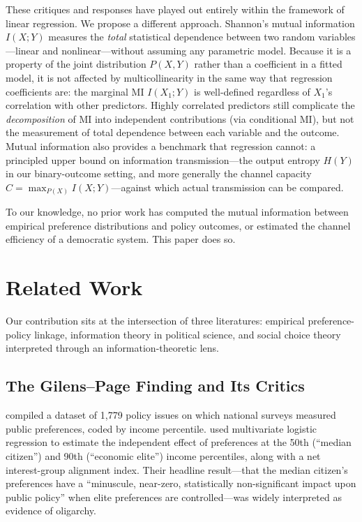 \documentclass[twocolumn,10pt]{article}
\begin{document}
These critiques and responses have played out entirely within the framework of linear regression.  We propose a different approach.  Shannon's mutual information $I(X;Y)$ measures the \emph{total} statistical dependence between two random variables---linear and nonlinear---without assuming any parametric model.  Because it is a property of the joint distribution $P(X,Y)$ rather than a coefficient in a fitted model, it is not affected by multicollinearity in the same way that regression coefficients are: the marginal MI $I(X_1;Y)$ is well-defined regardless of $X_1$'s correlation with other predictors.  Highly correlated predictors still complicate the \emph{decomposition} of MI into independent contributions (via conditional MI), but not the measurement of total dependence between each variable and the outcome.  Mutual information also provides a benchmark that regression cannot: a principled upper bound on information transmission---the output entropy $H(Y)$ in our binary-outcome setting, and more generally the channel capacity $C = \max_{P(X)} I(X;Y)$---against which actual transmission can be compared.

To our knowledge, no prior work has computed the mutual information between empirical preference distributions and policy outcomes, or estimated the channel efficiency of a democratic system.  This paper does so.

\section{Related Work}
\label{sec:related}

Our contribution sits at the intersection of three literatures: empirical preference-policy linkage, information theory in political science, and social choice theory interpreted through an information-theoretic lens.

\subsection{The Gilens--Page Finding and Its Critics}

\citet{gilens2012} compiled a dataset of 1,779 policy issues on which national surveys measured public preferences, coded by income percentile.  \citet{gilens2014testing} used multivariate logistic regression to estimate the independent effect of preferences at the 50th (``median citizen'') and 90th (``economic elite'') income percentiles, along with a net interest-group alignment index.  Their headline result---that the median citizen's preferences have a ``minuscule, near-zero, statistically non-significant impact upon public policy'' when elite preferences are controlled---was widely interpreted as evidence of oligarchy.
\end{document}
